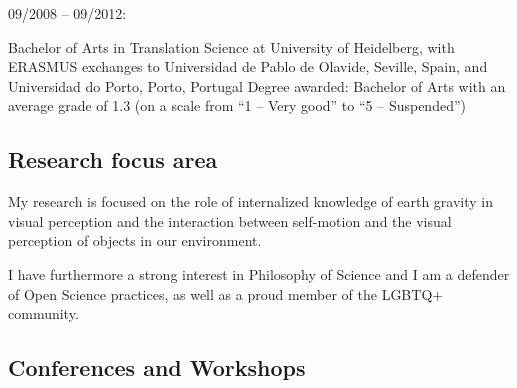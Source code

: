 \documentclass[]{article}
\begin{document}
09/2008 -- 09/2012:

Bachelor of Arts in Translation Science at University of Heidelberg,
with ERASMUS exchanges to Universidad de Pablo de Olavide, Seville,
Spain, and Universidad do Porto, Porto, Portugal Degree awarded:
Bachelor of Arts with an average grade of 1.3 (on a scale from ``1 --
Very good'' to ``5 -- Suspended'')

\hypertarget{research-focus-area}{%
\subsection{Research focus area}\label{research-focus-area}}

My research is focused on the role of internalized knowledge of earth
gravity in visual perception and the interaction between self-motion and
the visual perception of objects in our environment.

I have furthermore a strong interest in Philosophy of Science and I am a
defender of Open Science practices, as well as a proud member of the
LGBTQ+ community.

\hypertarget{conferences-and-workshops}{%
\subsection{Conferences and Workshops}\label{conferences-and-workshops}}
\end{document}
